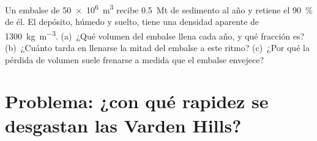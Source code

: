 \begin{exercise}[$\star\star\star$]\label{exo:b1:erosion-transport:12}
Un embalse de \qty{50e6}{m^3} recibe \qty{0.5}{Mt} de sedimento al año y retiene el \qty{90}{\percent} de él. El depósito, húmedo y suelto, tiene una densidad aparente
de \qty{1300}{kg.m^{-3}}. (a)~¿Qué volumen del embalse llena cada año, y qué fracción es? (b)~¿Cuánto tarda en llenarse la mitad del embalse a este ritmo? (c)~¿Por qué la
pérdida de volumen suele frenarse a medida que el embalse envejece?
\end{exercise}

\section{Problema: ¿con qué rapidez se desgastan las Varden Hills?}

